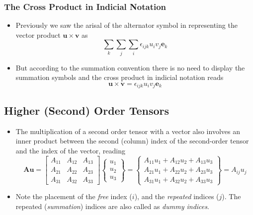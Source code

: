 \documentclass[11pt]{article}
\begin{document}
\subsubsection*{The Cross Product in Indicial Notation}
\label{sec:org29f803a}
\begin{itemize}
\item Previously we saw the arisal of the alternator symbol in representing the vector product \(\boldsymbol{u} \times \boldsymbol{v}\) as
$$  \sum_k \sum_j \sum_i \epsilon_{ijk} u_i v_j \boldsymbol{e}_k $$
\item But according to the summation convention there is no need to display the summation symbols and the cross product in indicial notation reads
$$ \boldsymbol{u} \times \boldsymbol{v} = \epsilon_{ijk} u_i v_j \boldsymbol{e}_k $$
\end{itemize}
\subsection*{Higher (Second) Order Tensors}
\label{sec:orgd12a04e}
\begin{itemize}
\item The multiplication of a second order tensor with a vector also involves an inner product between the second (column) index of the second-order tensor and the index of the vector, reading
$$ \boldsymbol{A} \boldsymbol{u} = \begin{bmatrix} A_{11} & A_{12} & A_{13} \\ A_{21} & A_{22} & A_{23} \\ A_{31} & A_{32} & A_{33} \end{bmatrix} \begin{Bmatrix} u_1 \\ u_2 \\ u_3 \end{Bmatrix} = \begin{Bmatrix} A_{11} u_1 + A_{12} u_2 + A_{13} u_3 \\ A_{21} u_1 + A_{22} u_2 + A_{23} u_3 \\ A_{31} u_1 + A_{32} u_2 + A_{33} u_3 \end{Bmatrix} =  A_{ij} u_j$$
\item Note the placement of the \emph{free} index (\(i\)), and the \emph{repeated} indices (\(j\)). The repeated (\emph{summation}) indices are also called as \emph{dummy indices}.
\end{itemize}
\end{document}
